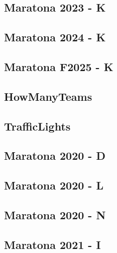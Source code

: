 \documentclass[10pt, a4paper, twocolumn, landscape]{article}
\begin{document}
\subsection{Maratona 2023 - K}

\vspace{0.2cm}
\subsection{Maratona 2024 - K}

\vspace{0.2cm}
\subsection{Maratona F2025 - K}

\vspace{0.2cm}
\subsection{HowManyTeams}

\vspace{0.2cm}
\subsection{TrafficLights}

\vspace{0.2cm}
\subsection{Maratona 2020 - D}

\vspace{0.2cm}
\subsection{Maratona 2020 - L}

\vspace{0.2cm}
\subsection{Maratona 2020 - N}

\vspace{0.2cm}
\subsection{Maratona 2021 - I}

\vspace{0.2cm}
\end{document}
